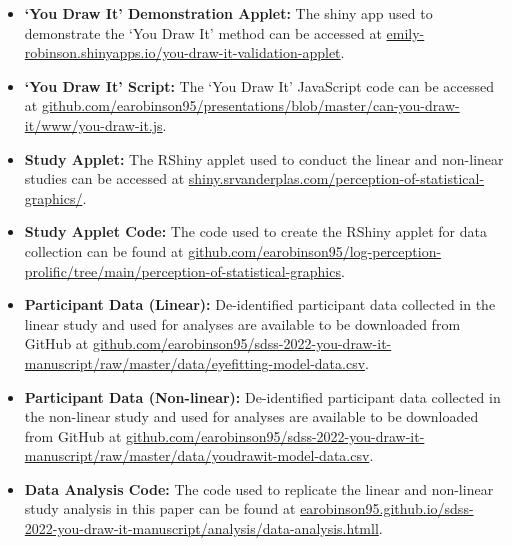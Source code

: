 \documentclass[
]{jds}
\providecommand{\tightlist}{%
  \setlength{\itemsep}{0pt}\setlength{\parskip}{0pt}}\usepackage{longtable,booktabs,array}
\begin{document}
\begin{itemize}
\tightlist
\item
  \textbf{`You Draw It' Demonstration Applet:} The shiny app used to
  demonstrate the `You Draw It' method can be accessed at
  \href{https://emily-robinson.shinyapps.io/you-draw-it-validation-applet/}{emily-robinson.shinyapps.io/you-draw-it-validation-applet}.
\item
  \textbf{`You Draw It' Script:} The `You Draw It' JavaScript code can
  be accessed at
  \href{https://github.com/earobinson95/presentations/blob/master/can-you-draw-it/www/you-draw-it.js}{github.com/earobinson95/presentations/blob/master/can-you-draw-it/www/you-draw-it.js}.
\item
  \textbf{Study Applet:} The RShiny applet used to conduct the linear
  and non-linear studies can be accessed at
  \href{https://shiny.srvanderplas.com/perception-of-statistical-graphics/}{shiny.srvanderplas.com/perception-of-statistical-graphics/}.
\item
  \textbf{Study Applet Code:} The code used to create the RShiny applet
  for data collection can be found at
  \href{https://github.com/earobinson95/log-perception-prolific/tree/main/perception-of-statistical-graphics}{github.com/earobinson95/log-perception-prolific/tree/main/perception-of-statistical-graphics}.
\item
  \textbf{Participant Data (Linear):} De-identified participant data
  collected in the linear study and used for analyses are available to
  be downloaded from GitHub at
  \href{https://github.com/earobinson95/sdss-2022-you-draw-it-manuscript/raw/master/data/eyefitting-model-data.csv}{github.com/earobinson95/sdss-2022-you-draw-it-manuscript/raw/master/data/eyefitting-model-data.csv}.
\item
  \textbf{Participant Data (Non-linear):} De-identified participant data
  collected in the non-linear study and used for analyses are available
  to be downloaded from GitHub at
  \href{https://github.com/earobinson95/sdss-2022-you-draw-it-manuscript/raw/master/data/youdrawit-model-data.csv}{github.com/earobinson95/sdss-2022-you-draw-it-manuscript/raw/master/data/youdrawit-model-data.csv}.
\item
  \textbf{Data Analysis Code:} The code used to replicate the linear and
  non-linear study analysis in this paper can be found at
  \href{https://earobinson95.github.io/sdss-2022-you-draw-it-manuscript/analysis/data-analysis.html}{earobinson95.github.io/sdss-2022-you-draw-it-manuscript/analysis/data-analysis.htmll}.
\end{itemize}
\end{document}
